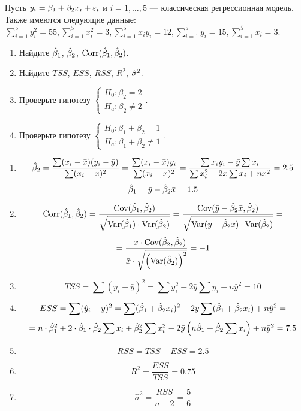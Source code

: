 \begin{problem}
Пусть $y_i = \beta_1 + \beta_2 x_i + \varepsilon_i$ и $i = 1, \dots, 5$ — классическая регрессионная модель. Также имеются следующие данные: $\sum_{i=1}^5 y_i^2 = 55, \sum_{i=1}^5 x_i^2 = 3, \sum_{i=1}^5 x_iy_i = 12, \sum_{i=1}^5 y_i = 15, \sum_{i=1}^5 x_i = 3$.

\begin{enumerate}
\item Найдите $\hat{\beta}_1$, $\hat{\beta}_2$, $\operatorname{Corr}(\hat{\beta}_1, \hat{\beta}_2)$.
\item Найдите $TSS$, $ESS$, $RSS$, $R^2$, $\hat{\sigma}^2$.
\item Проверьте гипотезу $\begin{cases}  H_0: \beta_2 = 2  \\ H_a: \beta_2 \not= 2 \end{cases}$.
\item Проверьте гипотезу $\begin{cases}  H_0: \beta_1 + \beta_2 = 1  \\ H_a: \beta_1 + \beta_2 \not= 1 \end{cases}$.
\end{enumerate}

\begin{sol}
\begin{enumerate}
\item
\[\hat{\beta}_2 = \frac{\sum (x_i - \bar{x}) (y_i - \bar{y})}{\sum (x_i-\bar{x})^2} = \frac{\sum (x_i - \bar{x})y_i}{\sum (x_i-\bar{x})^2} = \frac{\sum x_i y_i - \bar{y} \sum x_i}{\sum x_i^2 - 2 \bar{x} \sum x_i + n \bar{x}^2}=2.5\]
\[\hat{\beta}_1 = \bar{y} - \hat{\beta}_2 \bar{x} = 1.5 \]
\item
\[\operatorname{Corr}(\hat{\beta}_1, \hat{\beta}_2) = \frac{\operatorname{Cov} (\hat{\beta}_1, \hat{\beta}_2)}{\sqrt{\operatorname{Var} (\hat{\beta}_1)\cdot \operatorname{Var} (\hat{\beta}_2)}}=\frac{\operatorname{Cov} (\bar{y}-\hat{\beta}_2 \bar{x}, \hat{\beta}_2)}{\sqrt{\operatorname{Var} (\bar{y}-\hat{\beta}_2 \bar{x})\cdot \operatorname{Var} (\hat{\beta}_2)}} = \]
\[ = \frac{-\bar{x} \cdot \operatorname{Cov}(\hat{\beta}_2,\hat{\beta}_2)}{\bar{x}\cdot\sqrt{\left(\operatorname{Var} (\hat{\beta}_2) \right)^2}} = -1  \]
\item
\[TSS = \sum (y_i - \bar{y})^2 = \sum y_i^2 - 2 \bar{y} \sum y_i + n \bar{y}^2 = 10 \]
\item
\[ESS = \sum (\hat{y}_i - \bar{y})^2 = \sum (\hat{\beta}_1 + \hat{\beta}_2 x_i)^2 - 2\bar{y} \sum (\hat{\beta}_1 + \hat{\beta}_2 x_i) + n \hat{y}^2 = \]
\[ =n\cdot \hat{\beta}_1^2 +2 \cdot \hat{\beta}_1 \cdot \hat{\beta}_2 \sum x_i + \hat{\beta}_2^2 \sum x_i^2 - 2\bar{y} \left(n\hat{\beta}_1 + \hat{\beta}_2 \sum x_i \right) + n \bar{y}^2 = 7.5 \]
\item
\[RSS = TSS - ESS = 2.5 \]
\item
\[R^2 = \frac{ESS}{TSS} = 0.75 \]
\item
\[\hat{\sigma}^2 = \frac{RSS}{n - 2} = \frac{5}{6} \]
\end{enumerate}


\end{sol}
\end{problem}
